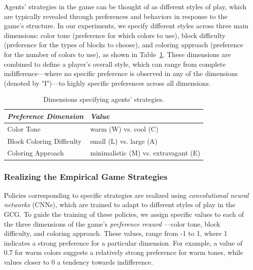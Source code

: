         \noindent
        Agents' strategies in the game can be thought of as different styles of play, which are typically revealed through preferences and behaviors in response to the game’s structure. In our experiments, we specify different styles across three main dimensions: color tone (preference for which colors to use), block difficulty (preference for the types of blocks to choose), and coloring approach (preference for the number of colors to use), as shown in Table~\ref{tab:preferences}. These dimensions are combined to define a player's overall style, which can range from complete indifference—where no specific preference is observed in any of the dimensions (denoted by "I")—to highly specific preferences across all dimensions.
        \begin{table}[H]
            \centering
            \caption{Dimensions specifying agents' strategies.}
            \label{tab:preferences}
            \vspace{0.5em}
            \begin{tabular}{ll}
                \toprule
                \textit{Preference Dimension} & \textit{Value} \\ 
                \midrule
                Color Tone & warm (W) vs. cool (C) \\ 
                Block Coloring Difficulty & small (L) vs. large (A) \\ 
                Coloring Approach & minimalistic (M) vs. extravagant (E) \\ 
                \bottomrule
            \end{tabular}
        \end{table}

    \subsubsection{Realizing the Empirical Game Strategies}

        Policies corresponding to specific strategies are realized using \emph{convolutional neural networks} (CNNs), which are trained to adapt to different styles of play in the GCG. To guide the training of these policies, we assign specific values to each of the three dimensions of the game's \emph{preference reward} —color tone, block difficulty, and coloring approach. These values, range from -1 to 1, where 1 indicates a strong preference for a particular dimension. For example, a value of 0.7 for warm colors suggests a relatively strong preference for warm tones, while values closer to 0 a tendency towards indifference.\tinydouble
        
